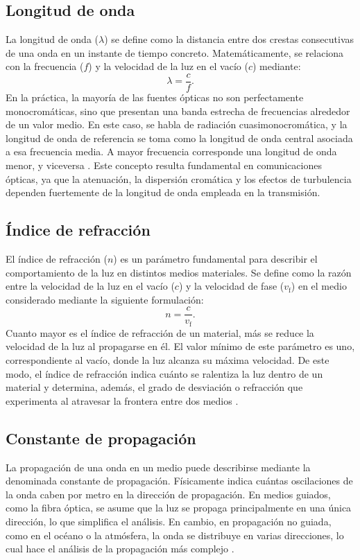 \subsection{Longitud de onda}
La longitud de onda ($\lambda$) se define como la distancia entre dos crestas consecutivas de una onda en un instante de tiempo concreto\cite{España}. Matemáticamente, se relaciona con la frecuencia ($f$) y la velocidad de la luz en el vacío ($c$) mediante:
\begin{equation}
\lambda = \frac{c}{f}.
\label{eq:lambdacnu}
\end{equation}
En la práctica, la mayoría de las fuentes ópticas no son perfectamente monocromáticas, sino que presentan una banda estrecha de frecuencias alrededor de un valor medio. En este caso, se habla de radiación cuasimonocromática, y la longitud de onda de referencia se toma como la longitud de onda central asociada a esa frecuencia media. A mayor frecuencia corresponde una longitud de onda menor, y viceversa \cite{España}. Este concepto resulta fundamental en comunicaciones ópticas, ya que la atenuación, la dispersión cromática y los efectos de turbulencia dependen fuertemente de la longitud de onda empleada en la transmisión.

\subsection{Índice de refracción}
El índice de refracción ($n$) es un parámetro fundamental para describir el comportamiento de la luz en distintos medios materiales. Se define como la razón entre la velocidad de la luz en el vacío ($c$) y la velocidad de fase ($v_\mathrm{f}$) en el medio considerado mediante la siguiente formulación\cite{España}:
\begin{equation}
n = \frac{c}{v_\mathrm{f}}.
\label{eq:n-c-vf}
\end{equation}
Cuanto mayor es el índice de refracción de un material, más se reduce la velocidad de la luz al propagarse en él. El valor mínimo de este parámetro es uno, correspondiente al vacío, donde la luz alcanza su máxima velocidad. De este modo, el índice de refracción indica cuánto se ralentiza la luz dentro de un material y determina, además, el grado de desviación o refracción que experimenta al atravesar la frontera entre dos medios \cite{Britannica}.

\subsection{Constante de propagación}
La propagación de una onda en un medio puede describirse mediante la denominada constante de propagación. Físicamente indica cuántas oscilaciones de la onda caben por metro en la dirección de propagación. En medios guiados, como la fibra óptica, se asume que la luz se propaga principalmente en una única dirección, lo que simplifica el análisis. En cambio, en propagación no guiada, como en el océano o la atmósfera, la onda se distribuye en varias direcciones, lo cual hace el análisis de la propagación más complejo \cite{España}.



